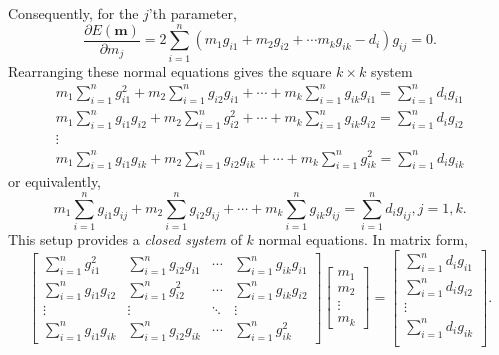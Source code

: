Consequently, for the $j$'th parameter,
\begin{equation}
\frac{\partial E(\mathbf{m})}{\partial m_j} = 2 \displaystyle \sum ^n _{i=1}(m_1g_{i1} + m_2g_{i2} + \cdots m_k g_{ik} -d_i)g_{ij}= 0.
\end{equation}
Rearranging these normal equations gives the square $k \times k$ system
\begin{equation}
\begin{array}{c}
m_1 \displaystyle \sum ^n _{i=1} g^2_{i1} + m_2 \displaystyle \sum ^n _{i=1} g_{i2} g_{i1} + \cdots + m_k 
 \displaystyle \sum ^n _{i=1} g_{ik}g_{i1} =  \displaystyle \sum^n _{i=1} d_i g_{i1}\\
m_1 \displaystyle \sum ^n _{i=1} g_{i1}g_{i2} + m_2 \displaystyle \sum ^n _{i=1} g^2_{i2} + \cdots + m_k  \displaystyle \sum ^n _{i=1} g_{ik}g_{i2} =  \displaystyle \sum^n _{i=1} d_i g_{i2}\\
\vdots \\
m_1 \displaystyle \sum ^n _{i=1} g_{i1}g_{ik} + m_2 \displaystyle \sum ^n _{i=1} g_{i2} g_{ik} + \cdots + m_k 
 \displaystyle \sum ^n _{i=1} g^2_{ik} =  \displaystyle \sum^n _{i=1} d_i g_{ik}
\end{array}
\end{equation}
or equivalently,
\begin{equation}
m_1 \displaystyle \sum ^n _{i=1} g_{i1}g_{ij} + m_2 \displaystyle \sum ^n _{i=1} g_{i2} g_{ij} + \cdots + m_k 
 \displaystyle \sum ^n _{i=1} g_{ik}g_{ij} =  \displaystyle \sum^n _{i=1} d_i g_{ij}, j=1,k.
\end{equation}
This setup provides a \emph{closed system} of $k$ normal equations.  In matrix form,
\begin{equation}
\left [  \begin{array}{cccc}
\displaystyle \sum ^n _{i=1} g^2_{i1} & \displaystyle \sum ^n _{i=1} g_{i2}g_{i1} & \cdots &
\displaystyle \sum ^n _{i=1} g_{ik}g_{i1} \\
\displaystyle \sum ^n _{i=1} g_{i1}g_{i2} &  \displaystyle \sum ^n _{i=1} g^2_{i2} & \cdots &
\displaystyle \sum^n _{i=1} g_{ik}g_{i2} \\
\vdots & \vdots & \ddots & \vdots\\
\displaystyle \sum ^n _{i=1} g_{i1}g_{ik} &  \displaystyle \sum ^n _{i=1} g_{i2}g_{ik} & \cdots & \displaystyle \sum ^n _{i=1} g^2_{ik} 
\end{array}   \right ]	\left[ \begin{array}{c} m_1 \\ m_2 \\ \vdots \\ m_k     \end{array}  \right ]  = \left[  \begin{array}{c}\displaystyle \sum ^n _{i=1} d_{i}g_{i1}\\
\displaystyle \sum ^n _{i=1} d_{i}g_{i2}\\
\vdots \\
\displaystyle \sum ^n _{i=1} d_{i}g_{ik}\\
   \end{array} \right].
\label{eq:normalwsums}
\end{equation}
